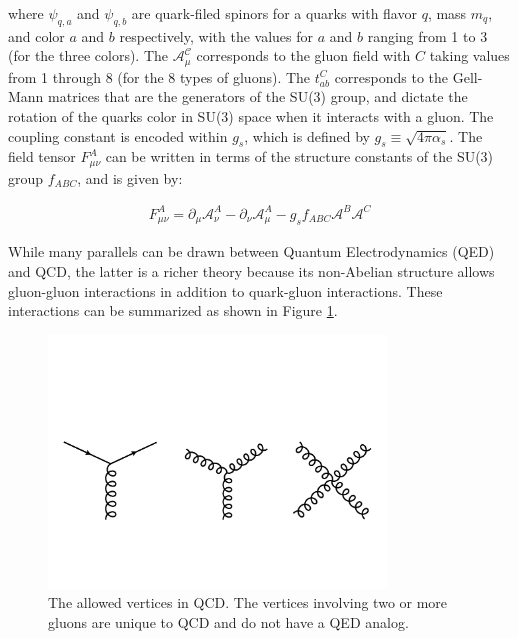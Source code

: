 where $\psi_{q,a}$ and $\psi_{q,b}$ are quark-filed spinors for a quarks with flavor $q$, mass $m_q$, and color $a$ and $b$ respectively, with the values for $a$ and $b$ ranging  from 1 to 3 (for the three colors). The $\mathcal{A_\mu^C}$ corresponds to the gluon field with $C$ taking values from 1 through 8 (for the 8 types of gluons). The $t_{ab}^C$ corresponds to the Gell-Mann matrices that are the generators of the SU(3) group, and dictate the rotation of the quarks color in SU(3) space when it interacts with a gluon. The coupling constant is encoded within $g_s$, which is defined by $g_s \equiv \sqrt{4 \pi \alpha_s}$. The field tensor $F_{\mu\nu}^A$ can be written in terms of the structure constants of the SU(3) group $f_{ABC}$, and is given by:

\begin{align}
F_{\mu\nu}^A = \partial_\mu \mathcal{A}_\nu^A - \partial_\nu \mathcal{A}_\mu^A - g_s f_{ABC} \mathcal{A}^B \mathcal{A}^C
\end{align}


While many parallels can be drawn between Quantum Electrodynamics (QED) and QCD, the latter is a richer theory because its non-Abelian structure allows gluon-gluon interactions in addition to quark-gluon interactions. These interactions can be summarized as shown in Figure \ref{fig:qcd_diagrams}.

\begin{figure}[htbp]
\begin{center}
\includegraphics[width=0.8\textwidth]{figures/theory/qcd_diagrams}
\caption{The allowed vertices in QCD. The vertices involving two or more gluons are unique to QCD and do not have a QED analog. }
\label{fig:qcd_diagrams}
\end{center}
\end{figure}

